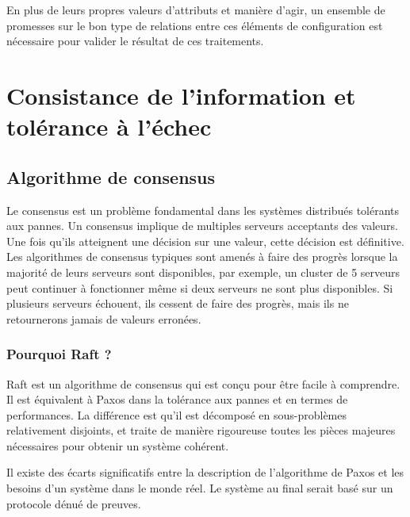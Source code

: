 En plus de leurs propres valeurs d'attributs et manière d'agir, un ensemble de
promesses sur le bon type de relations entre ces éléments de configuration est
nécessaire pour valider le résultat de ces traitements.

\section{Consistance de l'information et tolérance à l'échec}

\subsection{Algorithme de consensus}
\label{sec:consensus}

Le consensus est un problème fondamental dans les systèmes distribués tolérants
aux pannes. Un consensus implique de multiples serveurs acceptants des valeurs.
Une fois qu'ils atteignent une décision sur une valeur, cette décision est
définitive. Les algorithmes de consensus typiques sont amenés à faire des
progrès lorsque la majorité de leurs serveurs sont disponibles, par exemple, un
cluster de 5 serveurs peut continuer à fonctionner même si deux serveurs ne sont
plus disponibles. Si plusieurs serveurs échouent, ils cessent de faire des
progrès, mais ils ne retournerons jamais de valeurs erronées.

\subsubsection{Pourquoi Raft ?}

Raft est un algorithme de consensus qui est conçu pour être facile à comprendre.
Il est équivalent à Paxos dans la tolérance aux pannes et en termes de
performances. La différence est qu'il est décomposé en sous-problèmes
relativement disjoints, et traite de manière rigoureuse toutes les pièces
majeures nécessaires pour obtenir un système cohérent.

Il existe des écarts significatifs entre la description de l'algorithme de Paxos
et les besoins d'un système dans le monde réel. Le système au final serait basé
sur un protocole dénué de preuves.

